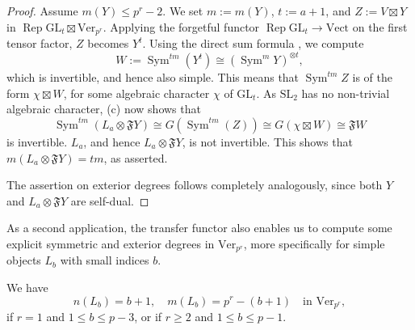 \documentclass[11pt,oneside]{amsart}
\theoremstyle{definition}
\theoremstyle{remark}
\numberwithin{equation}{section}
\newcommand\Ver{\mathrm{Ver}}
\newcommand\SL{\mathrm{SL}}
\newcommand\GL{\mathrm{GL}}
\newcommand\Vect{\mathrm{Vect}}
\newcommand\Rep{\operatorname{Rep}}
\newcommand\Sym{\operatorname{Sym}}
\renewcommand\o\otimes
\renewcommand\:\colon
\newcommand\Ffrak{\mathfrak F}
\begin{document}
\begin{proof} Assume $m(Y)\le p^r-2$. We set $m:=m(Y)$, $t:=a+1$, and $Z:=V\boxtimes Y$ in $\Rep\GL_t\boxtimes\Ver_{p^r}$. Applying the forgetful functor $\Rep\GL_t\to\Vect$ on the first tensor factor, $Z$ becomes $Y^t$. Using the direct sum formula , we compute
$$
W:=\Sym^{tm}(Y^t) \cong (\Sym^m Y)^{\o t} ,
$$
which is invertible, and hence also simple. This means that $\Sym^{tm} Z$ is of the form $\chi\boxtimes W$, for some algebraic character $\chi$ of $\GL_t$. As $\SL_2$ has no non-trivial algebraic character, (c) now shows that
$$
\Sym^{tm}(L_a\o \Ffrak Y) \cong G(\Sym^{tm}(Z)) \cong G(\chi\boxtimes W) \cong \Ffrak W
$$
is invertible. $L_a$, and hence $L_a\o \Ffrak Y$, is not invertible. This shows that $m(L_a\o \Ffrak Y)=tm$, as asserted.

The assertion on exterior degrees follows completely analogously, since both $Y$ and $L_a\o\Ffrak Y$ are self-dual.
\end{proof}

As a second application, the transfer functor also enables us to compute some explicit symmetric and exterior degrees in $\Ver_{p^r}$, more specifically for simple objects $L_b$ with small indices $b$.

\begin{proposition} \label{prop:restricted} We have 
$$
n(L_b) = b+1 ,\quad
m(L_b) = p^r - (b+1) \quad
\text{in } \Ver_{p^r} ,
$$
if $r=1$ and $1\le b\le p-3$, or if $r\ge2$ and $1\le b\le p-1$.
\end{proposition}
\end{document}
